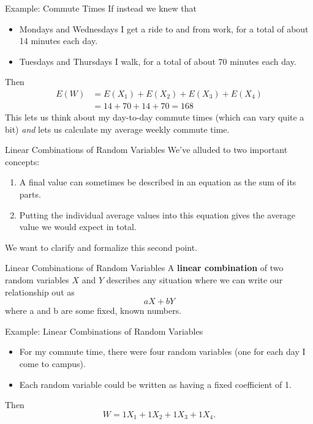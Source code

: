 \begin{frame}{Example: Commute Times}
    If instead we knew that 
    \begin{itemize}
        \item Mondays and Wednesdays I get a ride to and from work, for a total of about 14 minutes each day.
        \item Tuesdays and Thursdays I walk, for a total of about 70 minutes each day.
    \end{itemize}
    Then
    \begin{align*}
        E(W) &= E(X_1) + E(X_2) + E(X_3) + E(X_4) \\ 
        &= 14 + 70 + 14 + 70 = 168
    \end{align*}
    This lets us think about my day-to-day commute times (which can vary quite a bit) \textit{and} lets us calculate my average weekly commute time. 
\end{frame}

\begin{frame}{Linear Combinations of Random Variables}
    We've alluded to two important concepts:
    \begin{enumerate}
        \item A final value can sometimes be described in an equation as the sum of its parts.
        \item Putting the individual average values into this equation gives the average value we would expect in total.
    \end{enumerate}
    We want to clarify and formalize this second point. 
\end{frame}

\begin{frame}{Linear Combinations of Random Variables}
    A \textbf{linear combination} of two random variables $X$ and $Y$ describes any situation where we can write our relationship out as
    \[
        aX + bY
    \]
    where a and b are some fixed, known numbers.
\end{frame}

\begin{frame}{Example: Linear Combinations of Random Variables}
    \begin{itemize}
        \item For my commute time, there were four random variables (one for each day I come to campus).
        \item Each random variable could be written as having a fixed coefficient of 1.
    \end{itemize}
    Then
    \[
        W=1X_1 +1X_2 +1X_3 +1X_4.
    \]
\end{frame}

